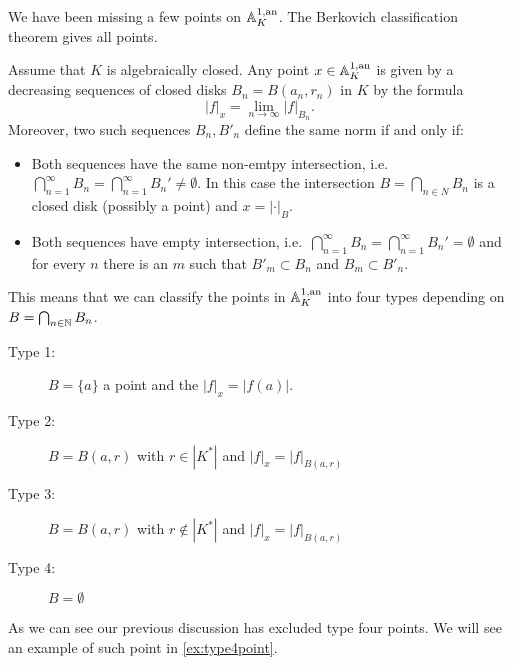 We have been missing a few points on $\mathbb{A}_K^{1, \text{an}}$. 
The Berkovich classification theorem gives all points. 
\begin{theorem}
	 \label{thm:berkovich_classification}
	Assume that $K$ is algebraically closed. 
	Any point $x \in \mathbb{A}_K^{1,\text{an}}$ is given by a decreasing sequences of closed disks $B_n = B(a_n, r_n)$ in $K$ by the formula \begin{equation}\label{eq:norm_disk_polynomial}
	|f|_x = \lim_{n \to \infty} |f|_{B_n}
	.\end{equation}
	Moreover, two such sequences $B_n, B'_n$ define the same norm if and only if:
	 \begin{itemize}
		\item Both sequences have the same non-emtpy intersection, i.e.\ $\bigcap_{n = 1}^{\infty} B_n = \bigcap_{n = 1}^{\infty} B_n' \ne \emptyset$. 
			In this case the intersection $B = \bigcap_{n \in N} B_n$ is a closed disk (possibly a point) and $x = |\cdot |_B$. 
		\item Both sequences have empty intersection, i.e.\ $\bigcap_{n = 1}^{\infty} B_n = \bigcap_{n = 1}^{\infty} B_n' = \emptyset$  and for every $n$ there is an $m$ such that $B'_m \subset  B_n$  and $B_m \subset  B'_n$.
	\end{itemize}
	This means that we can classify the points in $\mathbb{A} ^{1,\text{an}}_K$ into four types depending on $B = \bigcap_{n \in \mathbb{N}} B_n$. 
	\begin{description}
		\item[Type 1:] $B = \{a\} $ a point and the $|f|_x = |f(a)|$. 
		\item[Type 2:] $B = B(a, r)$ with $r \in |K^* |$ and $|f|_x = |f|_{B(a, r)}$
		\item[Type 3:] $B = B (a, r)$ with $r \not\in |K^*|$ and $|f|_x = |f|_{B(a, r)}$
		\item[Type 4:] $B = \emptyset$
	\end{description}
\end{theorem}
As we can see our previous discussion has excluded type four points. We will see an example of such point in \cref{ex:type4point}. 

